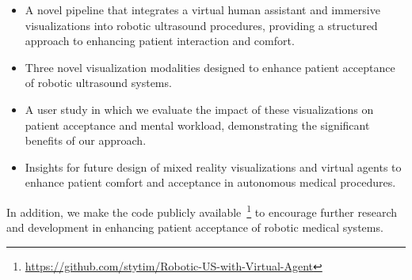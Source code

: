 \begin{itemize}
  \item A novel pipeline that integrates a virtual human assistant and immersive visualizations into robotic ultrasound procedures, providing a structured approach to enhancing patient interaction and comfort.
  \item Three novel visualization modalities designed to enhance patient acceptance of robotic ultrasound systems.
  \item A user study in which we evaluate the impact of these visualizations on patient acceptance and mental workload, demonstrating the significant benefits of our approach.
  \item Insights for future design of mixed reality visualizations and virtual agents to enhance patient comfort and acceptance in autonomous medical procedures.
\end{itemize}


 In addition, we make the code publicly available~\footnote{\url{https://github.com/stytim/Robotic-US-with-Virtual-Agent}} to encourage further research and development in enhancing patient acceptance of robotic medical systems.